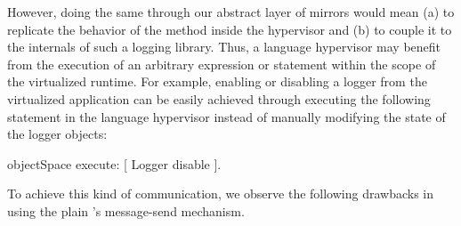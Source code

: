 However, doing the same through our abstract layer of mirrors would mean (a) to replicate the behavior of the  method inside the hypervisor and (b) to couple it to the internals of such a logging library. Thus, a language hypervisor may benefit from the execution of an arbitrary expression or statement within the scope of the virtualized runtime. For example, enabling or disabling a logger from the virtualized application can be easily achieved through executing the following statement in the language hypervisor instead of manually modifying the state of the logger objects:

\begin{code}
objectSpace execute: [ Logger disable ].
\end{code}

To achieve this kind of communication, we observe the following drawbacks in using the plain \VM's message-send mechanism. 

